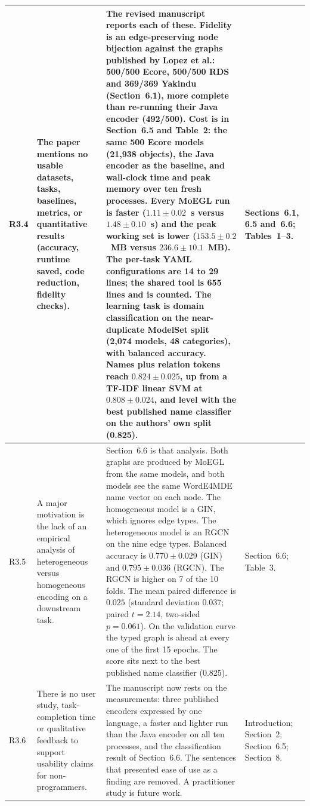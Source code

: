 \documentclass[11pt,a4paper]{article}
\begin{document}
\begin{longtable}{@{}P{1.0cm}P{4.3cm}P{5.9cm}P{3.9cm}@{}}
R3.4 &
The paper mentions no usable datasets, tasks, baselines, metrics, or quantitative results (accuracy, runtime saved, code reduction, fidelity checks). &
The revised manuscript reports each of these. Fidelity is an edge-preserving node bijection against the graphs published by Lopez et al.: 500/500 Ecore, 500/500 RDS and 369/369 Yakindu (Section~6.1), more complete than re-running their Java encoder (492/500). Cost is in Section~6.5 and Table~2: the same 500 Ecore models (21{,}938 objects), the Java encoder as the baseline, and wall-clock time and peak memory over ten fresh processes. Every MoEGL run is faster ($1.11\pm0.02$~s versus $1.48\pm0.10$~s) and the peak working set is lower ($153.5\pm0.2$~MB versus $236.6\pm10.1$~MB). The per-task YAML configurations are 14 to 29 lines; the shared tool is 655 lines and is counted. The learning task is domain classification on the near-duplicate ModelSet split (2{,}074 models, 48 categories), with balanced accuracy. Names plus relation tokens reach $0.824\pm0.025$, up from a TF-IDF linear SVM at $0.808\pm0.024$, and level with the best published name classifier on the authors' own split (0.825). &
Sections~6.1, 6.5 and~6.6; Tables~1--3. \\
\midrule

R3.5 &
A major motivation is the lack of an empirical analysis of heterogeneous versus homogeneous encoding on a downstream task. &
Section~6.6 is that analysis. Both graphs are produced by MoEGL from the same models, and both models see the same WordE4MDE name vector on each node. The homogeneous model is a GIN, which ignores edge types. The heterogeneous model is an RGCN on the nine edge types. Balanced accuracy is $0.770\pm0.029$ (GIN) and $0.795\pm0.036$ (RGCN). The RGCN is higher on 7 of the 10 folds. The mean paired difference is $0.025$ (standard deviation $0.037$; paired $t=2.14$, two-sided $p=0.061$). On the validation curve the typed graph is ahead at every one of the first 15 epochs. The score sits next to the best published name classifier (0.825). &
Section~6.6; Table~3. \\
\midrule

R3.6 &
There is no user study, task-completion time or qualitative feedback to support usability claims for non-programmers. &
The manuscript now rests on the measurements: three published encoders expressed by one language, a faster and lighter run than the Java encoder on all ten processes, and the classification result of Section~6.6. The sentences that presented ease of use as a finding are removed. A practitioner study is future work. &
Introduction; Section~2; Section~6.5; Section~8. \\
\midrule


\end{longtable}
\end{document}
